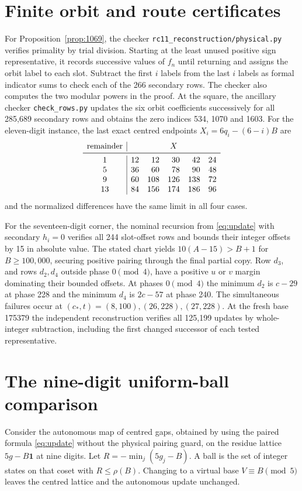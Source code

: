 \documentclass[11pt,reqno]{amsart}
\theoremstyle{definition}
\newcommand{\file}[1]{\nolinkurl{#1}}
\begin{document}
\section{Finite orbit and route certificates}\label{app:finite}
For Proposition~\ref{prop:1069}, the checker \file{rc11_reconstruction/physical.py} verifies primality by trial division. Starting at the least unused positive sign representative, it records successive values of \(f_n\) until returning and assigns the orbit label to each slot. Subtract the first \(i\) labels from the last \(i\) labels as formal indicator sums to check each of the 266 secondary rows. The checker also computes the two modular powers in the proof. At the square, the ancillary checker \file{check_rows.py} updates the six orbit coefficients successively for all 285,689 secondary rows and obtains the zero indices 534, 1070 and 1603. For the eleven-digit instance, the last exact centred endpoints \(X_i=6q_i-(6-i)B\) are
\[
\begin{array}{c|rrrrr}
\text{remainder}&\multicolumn{5}{c}{X}\\
\midrule
1&12&12&30&42&24\\
5&36&60&78&90&48\\
9&60&108&126&138&72\\
13&84&156&174&186&96
\end{array}
\]
and the normalized differences have the same limit in all four cases.

For the seventeen-digit corner, the nominal recursion from \eqref{eq:update} with secondary \(h_i=0\) verifies all 244 slot-offset rows and bounds their integer offsets by 15 in absolute value. The stated chart yields \(10(A-15)>B+1\) for \(B\ge100,000\), securing positive pairing through the final partial copy. Row \(d_3\), and rows \(d_2,d_4\) outside phase \(0\pmod4\), have a positive \(u\) or \(v\) margin dominating their bounded offsets. At phases \(0\pmod4\) the minimum \(d_2\) is \(c-29\) at phase 228 and the minimum \(d_4\) is \(2c-57\) at phase 240. The simultaneous failures occur at \((c_*,t)=(8,100),(26,228),(27,228)\). At the fresh base 175379 the independent reconstruction verifies all 125,199 updates by whole-integer subtraction, including the first changed successor of each tested representative.

\section{The nine-digit uniform-ball comparison}\label{app:ball}
Consider the autonomous map of centred gaps, obtained by using the paired formula \eqref{eq:update} without the physical pairing guard, on the residue lattice \(5g-B\mathbf1\) at nine digits. Let \(R=-\min_j(5g_j-B)\). A ball is the set of integer states on that coset with \(R\le\rho(B)\). Changing to a virtual base \(V\equiv B\pmod5\) leaves the centred lattice and the autonomous update unchanged.
\end{document}
